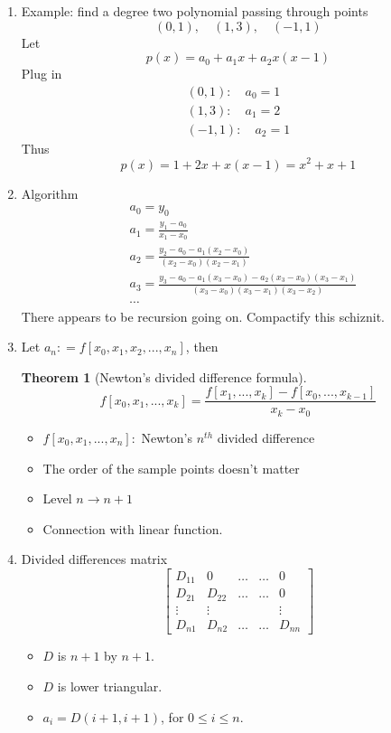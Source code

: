 \documentclass{article}
\newtheorem{thm}{Theorem}[section]
\theoremstyle{remark}
\begin{document}
\begin{enumerate}
\begin{enumerate}
\item Example: find a degree two polynomial passing through points
$$
(0,1), \quad (1,3),\quad (-1,1)
$$
Let
$$
p(x) = a_0 + a_1x + a_2 x(x-1)
$$
Plug in 
\begin{align*}
(0,1):\quad a_0 = 1\\
(1,3): \quad a_1 = 2\\
(-1,1): \quad a_2 = 1
\end{align*}
Thus
$$
p(x) = 1 + 2x+x(x-1) = x^2+x+1
$$

\item Algorithm
\begin{equation}
\nonumber
\begin{split}
& a_0 = y_0\\
& a_1 = \frac{y_1-a_0}{x_1-x_0}\\
& a_2 = \frac{y_2-a_0-a_1(x_2-x_0)}{(x_2-x_0)(x_2-x_1)}\\
& a_3 = \frac{y_3-a_0-a_1(x_3-x_0)-a_2(x_3-x_0)(x_3-x_1)}{(x_3-x_0)(x_3-x_1)(x_3-x_2)}\\
& \cdots
\end{split}
\end{equation}
There appears to be recursion going on. Compactify this schiznit. 
\item Let $a_n: = f[x_0,x_1,x_2,..., x_n]$, then
\begin{thm}[Newton's divided difference formula]
$$f[x_0,x_1,...,x_k] = \frac{f[x_1,...,x_k]-f[x_0,...,x_{k-1}]}{x_k-x_0}$$
\end{thm}
\begin{itemize}
\item $f[x_0,x_1, ..., x_n]:$ Newton's $n^{th}$ divided difference
\item The order of the sample points doesn't matter
\item Level $n\rightarrow n+1$
\item Connection with linear function.
\end{itemize}

\item Divided differences matrix 
$$
\begin{bmatrix}
D_{11} & 0 & \dots & \dots & 0 \\
D_{21} & D_{22} & \dots & \dots & 0 \\
\vdots & \vdots && & \vdots \\
D_{n1} & D_{n2} & \dots & \dots & D_{nn}
\end{bmatrix}
$$
\begin{itemize}
\item $D$ is $n+1$ by $n+1$.
\item $D$ is lower triangular.
\item $a_i = D(i+1,i+1)$, for $0\leq i\leq n$.
\end{itemize}


\end{enumerate}
\end{enumerate}
\end{document}
